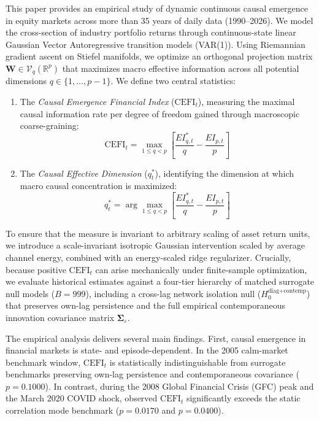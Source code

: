 \documentclass[review,12pt,authoryear]{elsarticle}
\begin{document}
This paper provides an empirical study of dynamic continuous causal emergence in equity markets across more than 35 years of daily data (1990--2026). We model the cross-section of industry portfolio returns through continuous-state linear Gaussian Vector Autoregressive transition models (VAR(1)). Using Riemannian gradient ascent on Stiefel manifolds, we optimize an orthogonal projection matrix $\mathbf{W} \in \mathcal{V}_q(\mathbb{R}^p)$ that maximizes macro effective information across all potential dimensions $q \in \{1, \dots, p-1\}$. We define two central statistics:
\begin{enumerate}[label=(\roman*)]
    \item The \emph{Causal Emergence Financial Index} ($\mathrm{CEFI}_t$), measuring the maximal causal information rate per degree of freedom gained through macroscopic coarse-graining:
    \begin{equation}
    \mathrm{CEFI}_t = \max_{1 \le q < p} \left[ \frac{EI_{q,t}^*}{q} - \frac{EI_{p,t}}{p} \right]
    \end{equation}
    \item The \emph{Causal Effective Dimension} ($q_t^*$), identifying the dimension at which macro causal concentration is maximized:
    \begin{equation}
    q_t^* = \arg\max_{1 \le q < p} \left[ \frac{EI_{q,t}^*}{q} - \frac{EI_{p,t}}{p} \right]
    \end{equation}
\end{enumerate}

To ensure that the measure is invariant to arbitrary scaling of asset return units, we introduce a scale-invariant isotropic Gaussian intervention scaled by average channel energy, combined with an energy-scaled ridge regularizer. Crucially, because positive $\mathrm{CEFI}_t$ can arise mechanically under finite-sample optimization, we evaluate historical estimates against a four-tier hierarchy of matched surrogate null models ($B=999$), including a cross-lag network isolation null ($H_0^{\text{diag+contemp}}$) that preserves own-lag persistence and the full empirical contemporaneous innovation covariance matrix $\boldsymbol{\Sigma}_\varepsilon$.

The empirical analysis delivers several main findings. First, causal emergence in financial markets is state- and episode-dependent. In the 2005 calm-market benchmark window, $\mathrm{CEFI}_t$ is statistically indistinguishable from surrogate benchmarks preserving own-lag persistence and contemporaneous covariance ($p = 0.1000$). In contrast, during the 2008 Global Financial Crisis (GFC) peak and the March 2020 COVID shock, observed $\mathrm{CEFI}_t$ significantly exceeds the static correlation mode benchmark ($p = 0.0170$ and $p = 0.0400$).
\end{document}
